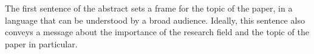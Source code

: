 


\noindent 
The first sentence of the abstract sets a frame for the topic of the paper, in a language that can be understood by a broad audience.
Ideally, this sentence also conveys a message about the importance of the research field and the topic of the paper in particular.
